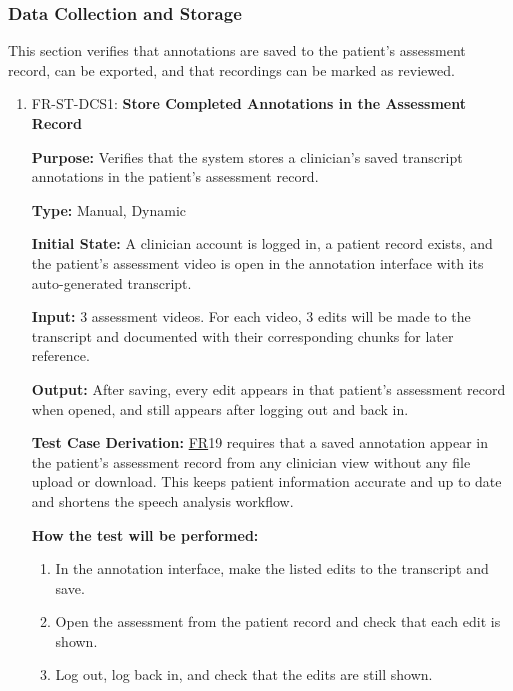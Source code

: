 \documentclass[12pt, titlepage]{article}
\newcommand{\srsfr}[1]{\href{https://github.com/Nour-Fawaz/MacaBoca/blob/main/pdfs/SRS/SRS.pdf}{FR}}
\renewcommand{\_}{\oldunderscore\allowbreak}
\begin{document}
\subsubsection{Data Collection and Storage}
This section verifies that annotations are saved to the patient's assessment record, can be exported, and that recordings can be marked as reviewed.
\begin{enumerate}
  \item FR-ST-DCS1: \textbf{Store Completed Annotations in the Assessment Record\\}
  \begin{mdframed}[linewidth=0.5mm]
      \textbf{Purpose:} Verifies that the system stores a clinician's saved transcript annotations in the patient's assessment record.\par
      \textbf{Type:} Manual, Dynamic \par
      \textbf{Initial State:} A clinician account is logged in, a patient record exists, and the patient's assessment video is open in the annotation interface with its auto-generated transcript. \par
      \textbf{Input:} 3 assessment videos. For each video, 3 edits will be made to the transcript and documented with their corresponding chunks for later reference. \par
      \textbf{Output:} After saving, every edit appears in that patient's assessment record when opened, and still appears after logging out and back in. \par
      \textbf{Test Case Derivation:} \srsfr*{19} requires that a saved annotation appear in the patient's assessment record from any clinician view without any file upload or download. This keeps patient information accurate and up to date and shortens the speech analysis workflow. \par
      \textbf{How the test will be performed:}
      \begin{enumerate}
        \item[1.] In the annotation interface, make the listed edits to the transcript and save.
        \item[2.] Open the assessment from the patient record and check that each edit is shown.
        \item[3.] Log out, log back in, and check that the edits are still shown.
      \end{enumerate}
  \end{mdframed}


\end{enumerate}
\end{document}
